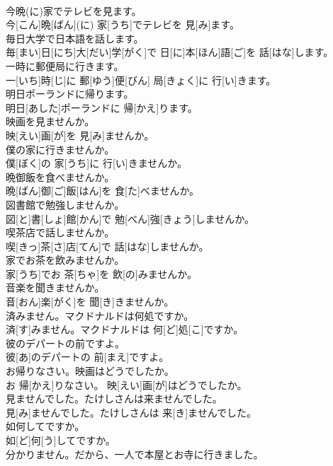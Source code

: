 \documentclass[8pt]{extreport}
\begin{document}
\begin{CJK}{UTF8}{min}
\\	今晩(に)家でテレビを見ます。	
\\	今[こん]晩[ばん](に) 家[うち]でテレビを 見[み]ます。
\\	毎日大学で日本語を話します。	
\\	毎[まい]日[にち]大[だい]学[がく]で 日[に]本[ほん]語[ご]を 話[はな]します。
\\	一時に郵便局に行きます。	
\\	一[いち]時[じ]に 郵[ゆう]便[びん] 局[きょく]に 行[い]きます。
\\	明日ポーランドに帰ります。	
\\	明日[あした]ポーランドに 帰[かえ]ります。
\\	映画を見ませんか。	
\\	映[えい]画[が]を 見[み]ませんか。
\\	僕の家に行きませんか。	
\\	僕[ぼく]の 家[うち]に 行[い]きませんか。
\\	晩御飯を食べませんか。	
\\	晩[ばん]御[ご]飯[はん]を 食[た]べませんか。
\\	図書館で勉強しませんか。	
\\	図[と]書[しょ]館[かん]で 勉[べん]強[きょう]しませんか。
\\	喫茶店で話しませんか。	
\\	喫[きっ]茶[さ]店[てん]で 話[はな]しませんか。
\\	家でお茶を飲みませんか。	
\\	家[うち]でお 茶[ちゃ]を 飲[の]みませんか。
\\	音楽を聞きませんか。	
\\	音[おん]楽[がく]を 聞[き]きませんか。
\\	済みません。マクドナルドは何処ですか。	
\\	済[す]みません。マクドナルドは 何[ど]処[こ]ですか。
\\	彼のデパートの前ですよ。	
\\	彼[あ]のデパートの 前[まえ]ですよ。
\\	お帰りなさい。映画はどうでしたか。	
\\	お 帰[かえ]りなさい。 映[えい]画[が]はどうでしたか。
\\	見ませんでした。たけしさんは来ませんでした。	
\\	見[み]ませんでした。たけしさんは 来[き]ませんでした。
\\	如何してですか。	
\\	如[ど]何[う]してですか。
\\	分かりません。だから、一人で本屋とお寺に行きました。	

\end{CJK}
\end{document}
